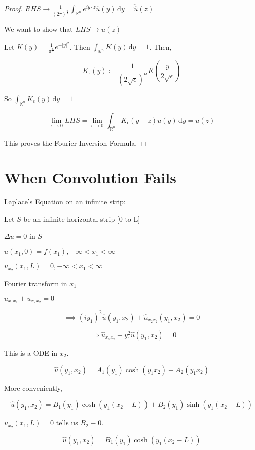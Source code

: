 \documentclass{article}
\theoremstyle{definition}
\begin{document}
\begin{proof}
    \(RHS \to \frac{1}{(2\pi)^\frac{n}{2}}\int_{\mathbb{R}^n}^{} e^{iy\cdot z}\hat{u}(y) \,\mathrm{d}y = \check{\hat{u}}(z)\) 

    We want to show that \(LHS \to u(z)\) 

    Let \(K(y) = \frac{1}{\pi^\frac{n}{2}}e^{-\vert y \vert ^2}\). Then \(\int_{\mathbb{R}^n}^{} K(y) \,\mathrm{d}y = 1\). Then,

    \[
        K_{\epsilon}(y) \coloneqq \frac{1}{(2\sqrt{\epsilon } )^n}K(\frac{y}{2\sqrt{\epsilon} }) 
    \]

    So \(\int_{\mathbb{R}^n}^{} K_{\epsilon}(y)  \,\mathrm{d}y = 1\)
    
    \[
        \lim_{\epsilon\to 0} LHS = \lim_{\epsilon \to 0} \int_{\mathbb{R}^n}^{} K_{\epsilon}(y-z)u(y)  \,\mathrm{d}y = u(z)
    \]

    This proves the Fourier Inversion Formula.

\end{proof}

\section*{When Convolution Fails}

\underline{Laplace's Equation on an infinite strip}:

Let \(S\) be an infinite horizontal strip [0 to L]

\(\Delta u = 0\) in \(S\)

\(u(x_1,0) = f(x_1), -\infty < x_1 < \infty\) 

\(u_{x_2}(x_1,L) = 0, -\infty < x_1 < \infty\) 

Fourier transform in \(x_1\) 

\(u_{x_1 x_1}+u_{x_2 x_2} = 0\)

\[
    \implies (i y_1)^2 \hat{u}(y_1,x_2)+\hat{u}_{x_2 x_2} (y_1,x_2) = 0
\]

\[
    \implies \hat{u}_{x_2 x_2} - y_1^2 \hat{u}(y_1,x_2) = 0
\]

This is a ODE in \(x_2\).

\[
    \hat{u}(y_1,x_2)= A_1(y_1)\cosh(y_1 x_2) + A_2(y_1 x_2)
\]

More conveniently,

\[
    \hat{u}(y_1,x_2) = B_1(y_1)\cosh(y_1(x_2 - L)) + B_2(y_1)\sinh (y_1(x_2 - L))
\]

\(u_{x_2}(x_1,L)=0\) tells us \(B_2 \equiv 0\).

\[
    \hat{u}(y_1,x_2) = B_1(y_1)\cosh(y_1(x_2 - L))
\]
\end{document}
